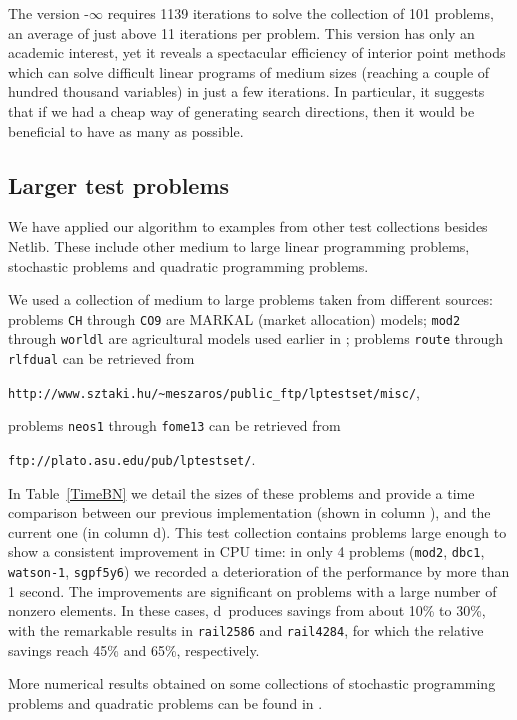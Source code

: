 The version \HO-$\infty$ requires 1139 iterations to solve 
the collection of 101 problems, an average of just above 11 iterations
per problem. This version has only an academic interest, 
yet it reveals a spectacular efficiency of interior point 
methods which can solve difficult linear programs of medium sizes 
(reaching a couple of hundred thousand variables) in just 
a few iterations.
In particular, it suggests that if we had a cheap way of generating
search directions, then it would be beneficial to have as many as possible.

%
%
\subsection{Larger test problems}
\label{BN-tests}

We have applied our algorithm to examples from other test collections 
besides Netlib.
These include other medium to large linear programming problems, 
stochastic problems and quadratic programming problems.

We used a collection of medium to large problems taken from different
sources: problems {\tt CH} through {\tt CO9}
are MARKAL (market allocation) models; {\tt mod2} through {\tt worldl} are
agricultural models used earlier in \cite{Gondzio96}; problems {\tt route}
through {\tt rlfdual} can be retrieved from 
\begin{center}
{\tt http://www.sztaki.hu/\~{}meszaros/public\_ftp/lptestset/misc/},
\end{center}
problems {\tt neos1} through {\tt fome13} can be retrieved from 
\begin{center}
{\tt ftp://plato.asu.edu/pub/lptestset/}.
\end{center}

In Table~\ref{TimeBN} we detail the sizes of these problems and provide 
a time comparison between our previous implementation (shown in column
\HO), and the current one (in column d\HO).
This test collection contains problems large enough 
to show a consistent improvement in CPU time: in only 4 problems 
({\tt mod2}, {\tt dbc1}, {\tt watson-1}, {\tt sgpf5y6}) 
we recorded a deterioration of the performance by more than 1 second.
The improvements are significant on problems with a large 
number of nonzero elements. In these cases, d\HO\
produces savings from about 10\% to 30\%, with the remarkable results
in {\tt rail2586} and {\tt rail4284}, for which the relative savings 
reach 45\% and 65\%, respectively.

More numerical results obtained on some collections of stochastic
programming problems and quadratic problems can be found in
\cite{ColomboGondzio05}.

